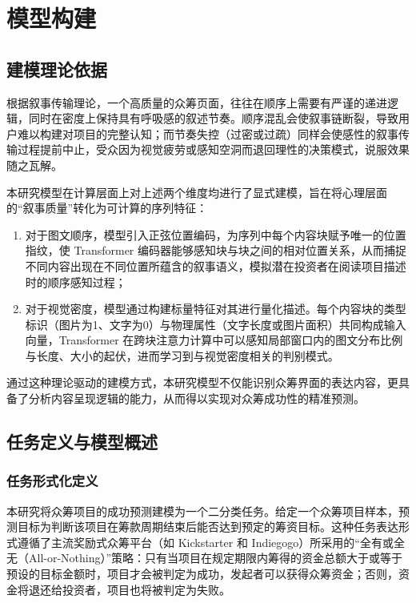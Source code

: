 \newpage
\setcounter{table}{0}
\setcounter{figure}{0}
\section{模型构建}

\subsection{建模理论依据}

根据叙事传输理论，一个高质量的众筹页面，往往在顺序上需要有严谨的递进逻辑，同时在密度上保持具有呼吸感的叙述节奏。顺序混乱会使叙事链断裂，导致用户难以构建对项目的完整认知；而节奏失控（过密或过疏）同样会使感性的叙事传输过程提前中止，受众因为视觉疲劳或感知空洞而退回理性的决策模式，说服效果随之瓦解。

本研究模型在计算层面上对上述两个维度均进行了显式建模，旨在将心理层面的``叙事质量''转化为可计算的序列特征：

\begin{enumerate}
\def\labelenumi{(\arabic{enumi})}
\item
  对于图文顺序，模型引入正弦位置编码，为序列中每个内容块赋予唯一的位置指纹，使 Transformer 编码器能够感知块与块之间的相对位置关系，从而捕捉不同内容出现在不同位置所蕴含的叙事语义，模拟潜在投资者在阅读项目描述时的顺序感知过程；
\item
  对于视觉密度，模型通过构建标量特征对其进行量化描述。每个内容块的类型标识（图片为1、文字为0）与物理属性（文字长度或图片面积）共同构成输入向量，Transformer 在跨块注意力计算中可以感知局部窗口内的图文分布比例与长度、大小的起伏，进而学习到与视觉密度相关的判别模式。
\end{enumerate}

通过这种理论驱动的建模方式，本研究模型不仅能识别众筹界面的表达内容，更具备了分析内容呈现逻辑的能力，从而得以实现对众筹成功性的精准预测。

\subsection{任务定义与模型概述}

\subsubsection{任务形式化定义}

本研究将众筹项目的成功预测建模为一个二分类任务。给定一个众筹项目样本，预测目标为判断该项目在筹款周期结束后能否达到预定的筹资目标。这种任务表达形式遵循了主流奖励式众筹平台（如 Kickstarter 和 Indiegogo）所采用的``全有或全无（All-or-Nothing）''策略：只有当项目在规定期限内筹得的资金总额大于或等于预设的目标金额时，项目才会被判定为成功，发起者可以获得众筹资金；否则，资金将退还给投资者，项目也将被判定为失败。

